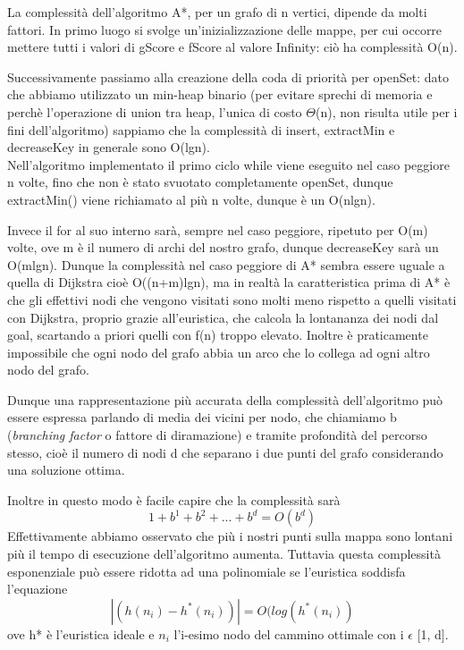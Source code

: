 \documentclass[12pt,a4paper]{report}
\begin{document}
La complessità dell'algoritmo A*, per un grafo di n vertici, dipende da molti fattori.
In primo luogo si svolge un'inizializzazione delle mappe, per cui occorre mettere tutti i valori di gScore e fScore al valore Infinity: ciò ha complessità O(n).


Successivamente passiamo alla creazione della coda di priorità per openSet: dato che abbiamo utilizzato un min-heap binario (per evitare sprechi di memoria e perchè l'operazione di union tra heap, l'unica di costo \(\Theta\)(n), non risulta utile per i fini dell'algoritmo) sappiamo che la complessità di insert, extractMin e decreaseKey in generale sono O(lgn).
\\

Nell'algoritmo implementato il primo ciclo while viene eseguito nel caso peggiore n volte, fino che non è stato svuotato completamente openSet, dunque extractMin() viene richiamato al più n volte, dunque è un O(nlgn).


Invece il for al suo interno sarà, sempre nel caso peggiore, ripetuto per O(m) volte, ove m è il numero di archi del nostro grafo, dunque decreaseKey sarà un O(mlgn). Dunque la complessità nel caso peggiore di A* sembra essere uguale a quella di Dijkstra cioè O((n+m)lgn), ma in realtà la caratteristica prima di A* è che gli effettivi nodi che vengono visitati sono molti meno rispetto a quelli visitati con Dijkstra, proprio grazie all'euristica, che calcola la lontananza dei nodi dal goal, scartando a priori quelli con f(n) troppo elevato.
Inoltre è praticamente impossibile che ogni nodo del grafo abbia un arco che lo collega ad ogni altro nodo del grafo.

Dunque una rappresentazione più accurata della complessità dell'algoritmo può essere espressa parlando di media dei vicini per nodo, che chiamiamo b (\emph{branching factor} o fattore di diramazione) e tramite profondità del percorso stesso, cioè il numero di nodi d che separano i due punti del grafo considerando una soluzione ottima.

Inoltre in questo modo è facile capire che la complessità sarà \[1+b^1+b^2+...+b^d = O(b^{d})\]\newpage
Effettivamente abbiamo osservato che più i nostri punti sulla mappa sono lontani più il tempo di esecuzione dell'algoritmo aumenta.
Tuttavia questa complessità esponenziale può essere ridotta ad una polinomiale se l'euristica soddisfa l'equazione \[|(h(n_i)-h^*(n_i))| = O(log(h^*(n_i))\]
ove h* è l'euristica ideale e \(n_i\) l'i-esimo nodo del cammino ottimale con i \(\epsilon\) [1, d].
\end{document}
